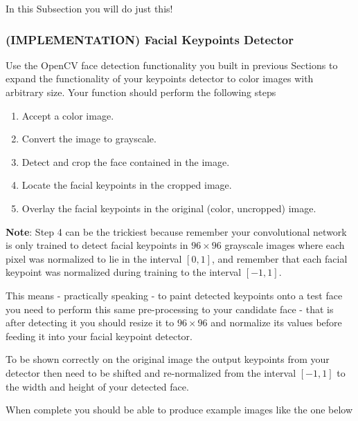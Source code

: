 \documentclass[11pt]{article}
\providecommand{\tightlist}{%
      \setlength{\itemsep}{0pt}\setlength{\parskip}{0pt}}
\begin{document}
In this Subsection you will do just this!

    \subsubsection{(IMPLEMENTATION) Facial Keypoints
Detector}\label{implementation-facial-keypoints-detector}

Use the OpenCV face detection functionality you built in previous
Sections to expand the functionality of your keypoints detector to color
images with arbitrary size. Your function should perform the following
steps

\begin{enumerate}
\def\labelenumi{\arabic{enumi}.}
\tightlist
\item
  Accept a color image.
\item
  Convert the image to grayscale.
\item
  Detect and crop the face contained in the image.
\item
  Locate the facial keypoints in the cropped image.
\item
  Overlay the facial keypoints in the original (color, uncropped) image.
\end{enumerate}

\textbf{Note}: Step 4 can be the trickiest because remember your
convolutional network is only trained to detect facial keypoints in
\(96 \times 96\) grayscale images where each pixel was normalized to lie
in the interval \([0,1]\), and remember that each facial keypoint was
normalized during training to the interval \([-1,1]\).

This means - practically speaking - to paint detected keypoints onto a
test face you need to perform this same pre-processing to your candidate
face - that is after detecting it you should resize it to
\(96 \times 96\) and normalize its values before feeding it into your
facial keypoint detector.

To be shown correctly on the original image the output keypoints from
your detector then need to be shifted and re-normalized from the
interval \([-1,1]\) to the width and height of your detected face.

When complete you should be able to produce example images like the one
below
\end{document}
